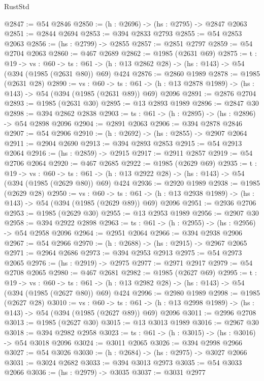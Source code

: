 \begin{lexlean}{RustStd}
\begin{coremodule}
{\begin{coremodule}
{{{{{{{{{{@2847 := @54 @2846
@2850 := (h : @2696) -> (hs : @2795) -> @2847 @2063
@2851 := @2844 @2694
@2853 := @394 @2833 @2793
@2855 := @54 @2853 @2063
@2856 := (hs : @2799) -> @2855
@2857 := @2851 @2797
@2859 := @54 @2704 @2063
@2860 := @467 @2689
@2862 := @1985 (@2631 @69)
@2875 := {t : @19} ->
  {vs : @60} ->
  {ts : @61} -> (h : @13 @2862 @28) -> (hs : @143) -> @54 (@394 (@1985 (@2631 @80)) @69) @424
@2876 := @2860 @1989
@2878 := @1985 (@2631 @28)
@2890 := {vs : @60} ->
  {ts : @61} -> (h : @13 @2878 @1989) -> (hs : @143) -> @54 (@394 (@1985 (@2631 @89)) @69) @2096
@2891 := @2876 @2704
@2893 := @1985 (@2631 @30)
@2895 := @13 @2893 @1989
@2896 := @2847 @30
@2898 := @394 @2862 @2838
@2903 := {ts : @61} -> (h : @2895) -> (hs : @2896) -> @54 @2898 @2096
@2904 := @2891 @2063
@2906 := @394 @2878 @2846
@2907 := @54 @2906
@2910 := (h : @2692) -> (hs : @2855) -> @2907 @2064
@2911 := @2904 @2690
@2913 := @394 @2893 @2853
@2915 := @54 @2913 @2064
@2916 := (hs : @2859) -> @2915
@2917 := @2911 @2857
@2919 := @54 @2706 @2064
@2920 := @467 @2685
@2922 := @1985 (@2629 @69)
@2935 := {t : @19} ->
  {vs : @60} ->
  {ts : @61} -> (h : @13 @2922 @28) -> (hs : @143) -> @54 (@394 (@1985 (@2629 @80)) @69) @424
@2936 := @2920 @1989
@2938 := @1985 (@2629 @28)
@2950 := {vs : @60} ->
  {ts : @61} -> (h : @13 @2938 @1989) -> (hs : @143) -> @54 (@394 (@1985 (@2629 @89)) @69) @2096
@2951 := @2936 @2706
@2953 := @1985 (@2629 @30)
@2955 := @13 @2953 @1989
@2956 := @2907 @30
@2958 := @394 @2922 @2898
@2963 := {ts : @61} -> (h : @2955) -> (hs : @2956) -> @54 @2958 @2096
@2964 := @2951 @2064
@2966 := @394 @2938 @2906
@2967 := @54 @2966
@2970 := (h : @2688) -> (hs : @2915) -> @2967 @2065
@2971 := @2964 @2686
@2973 := @394 @2953 @2913
@2975 := @54 @2973 @2065
@2976 := (hs : @2919) -> @2975
@2977 := @2971 @2917
@2979 := @54 @2708 @2065
@2980 := @467 @2681
@2982 := @1985 (@2627 @69)
@2995 := {t : @19} ->
  {vs : @60} ->
  {ts : @61} -> (h : @13 @2982 @28) -> (hs : @143) -> @54 (@394 (@1985 (@2627 @80)) @69) @424
@2996 := @2980 @1989
@2998 := @1985 (@2627 @28)
@3010 := {vs : @60} ->
  {ts : @61} -> (h : @13 @2998 @1989) -> (hs : @143) -> @54 (@394 (@1985 (@2627 @89)) @69) @2096
@3011 := @2996 @2708
@3013 := @1985 (@2627 @30)
@3015 := @13 @3013 @1989
@3016 := @2967 @30
@3018 := @394 @2982 @2958
@3023 := {ts : @61} -> (h : @3015) -> (hs : @3016) -> @54 @3018 @2096
@3024 := @3011 @2065
@3026 := @394 @2998 @2966
@3027 := @54 @3026
@3030 := (h : @2684) -> (hs : @2975) -> @3027 @2066
@3031 := @3024 @2682
@3033 := @394 @3013 @2973
@3035 := @54 @3033 @2066
@3036 := (hs : @2979) -> @3035
@3037 := @3031 @2977
}}}}}}}}}}
\end{coremodule}}
\end{coremodule}
\end{lexlean}

